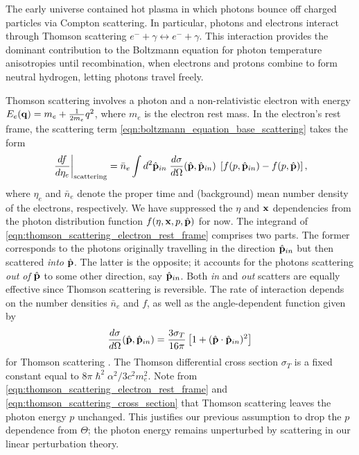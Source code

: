 The early universe contained hot plasma in which photons bounce off charged particles via Compton scattering. In particular, photons and electrons interact through Thomson scattering $e^- + \gamma \leftrightarrow e^- + \gamma$. This interaction provides the dominant contribution to the Boltzmann equation for photon temperature anisotropies until recombination, when electrons and protons combine to form neutral hydrogen, letting photons travel freely.

Thomson scattering involves a photon and a non-relativistic electron with energy $E_e (\mathbf{q}) = m_e + \frac{1}{2m_e} q^2$, where $m_e$ is the electron rest mass. In the electron's rest frame, the scattering term \eqref{eqn:boltzmann_equation_base_scattering} takes the form
\begin{align}
	\left. \frac{df}{d\eta_e} \right|_\text{scattering} = \bar{n}_e \int d^2 \hat{\mathbf{p}}_{in} \; \frac{d\sigma}{d\Omega} (\hat{\mathbf{p}}, \hat{\mathbf{p}}_{in}) \; \left[ f(p,\hat{\mathbf{p}}_{in}) - f(p,\hat{\mathbf{p}})\right], \label{eqn:thomson_scattering_electron_rest_frame}
\end{align}
where $\eta_e$ and $\bar{n}_e$ denote the proper time and (background) mean number density of the electrons, respectively. We have suppressed the $\eta$ and $\mathbf{x}$ dependencies from the photon distribution function $f(\eta,\mathbf{x},p,\hat{\mathbf{p}})$ for now. The integrand of \eqref{eqn:thomson_scattering_electron_rest_frame} comprises two parts. The former corresponds to the photons originally travelling in the direction $\hat{\mathbf{p}}_{in}$ but then scattered \textit{into} $\hat{\mathbf{p}}$. The latter is the opposite; it accounts for the photons scattering \textit{out of} $\hat{\mathbf{p}}$ to some other direction, say $\hat{\mathbf{p}}_{in}$. Both \textit{in} and \textit{out} scatters are equally effective since Thomson scattering is reversible. The rate of interaction depends on the number densities $\bar{n}_e$ and $f$, as well as the angle-dependent function given by
\begin{align}
	\frac{d\sigma}{d\Omega} (\hat{\mathbf{p}}, \hat{\mathbf{p}}_{in}) = \frac{3\sigma_T}{16\pi} \left[ 1 + (\hat{\mathbf{p}} \cdot \hat{\mathbf{p}}_{in})^2 \right] \label{eqn:thomson_scattering_cross_section}
\end{align}
for Thomson scattering \cite{Dodelson2003textbook}. The Thomson differential cross section $\sigma_T$ is a fixed constant equal to $8\pi\hslash^2 \alpha^2 / 3c^2 m_e^2$. Note from \eqref{eqn:thomson_scattering_electron_rest_frame} and \eqref{eqn:thomson_scattering_cross_section} that Thomson scattering leaves the photon energy $p$ unchanged. This justifies our previous assumption to drop the $p$ dependence from $\Theta$; the photon energy remains unperturbed by scattering in our linear perturbation theory.

